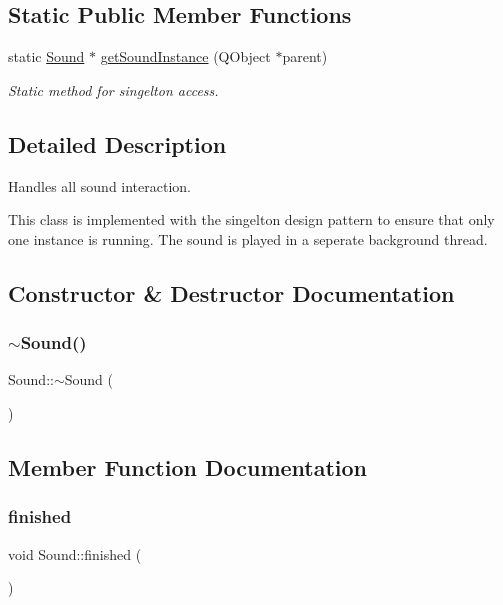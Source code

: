 \subsection*{Static Public Member Functions}
\begin{DoxyCompactItemize}
\item 
static \mbox{\hyperlink{class_sound}{Sound}} $\ast$ \mbox{\hyperlink{class_sound_a2685a4d6cbb5b6f57c1a8880336c68a5}{get\+Sound\+Instance}} (Q\+Object $\ast$parent)
\begin{DoxyCompactList}\small\item\em Static method for singelton access. \end{DoxyCompactList}\end{DoxyCompactItemize}


\subsection{Detailed Description}
Handles all sound interaction. 

This class is implemented with the singelton design pattern to ensure that only one instance is running. The sound is played in a seperate background thread. 

\subsection{Constructor \& Destructor Documentation}
\mbox{\label{class_sound_a0907389078bf740be2a5763366ad3376}} 
\subsubsection{\texorpdfstring{$\sim$Sound()}{~Sound()}}
{\footnotesize\ttfamily Sound\+::$\sim$\+Sound (\begin{DoxyParamCaption}{ }\end{DoxyParamCaption})}



\subsection{Member Function Documentation}
\mbox{\label{class_sound_a89d8715c7bb2fc7a0674eb214834c441}} 
\subsubsection{\texorpdfstring{finished}{finished}}
{\footnotesize\ttfamily void Sound\+::finished (\begin{DoxyParamCaption}{ }\end{DoxyParamCaption})\hspace{0.3cm}{\ttfamily [signal]}}




